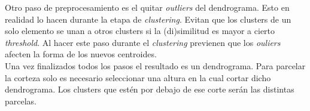 \vspace{0.1cm}

Otro paso de preprocesamiento es el quitar \textit{outliers} del dendrograma.
Esto en realidad lo hacen durante la etapa de \textit{clustering}. Evitan que los
clusters de un solo elemento se unan a otros clusters si la (di)similitud es 
mayor a cierto \textit{threshold}. Al hacer este paso durante el \textit{clustering}
previenen que los \textit{ouliers} afecten la forma de los nuevos centroides.\\

Una vez finalizados todos los pasos el resultado es un dendrograma. Para parcelar
la corteza solo es necesario seleccionar una altura en la cual cortar dicho
dendrograma. Los clusters que est\'en por debajo de ese corte ser\'an las distintas
parcelas. \\
